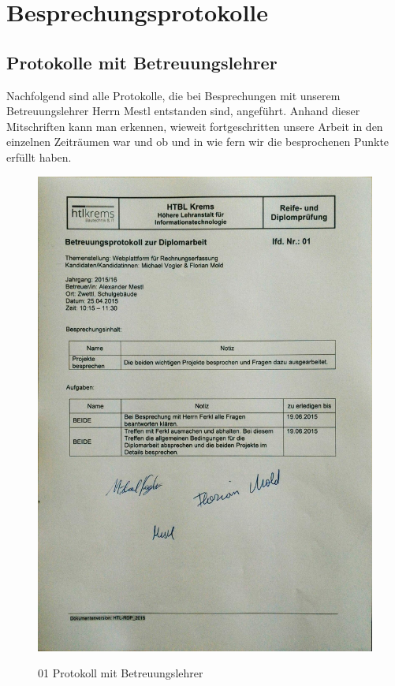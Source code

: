 \chapter{Besprechungsprotokolle}
\section{Protokolle mit Betreuungslehrer}
Nachfolgend sind alle Protokolle, die bei Besprechungen mit unserem Betreuungslehrer Herrn Mestl entstanden sind, angeführt. Anhand dieser Mitschriften kann man erkennen, wieweit fortgeschritten unsere Arbeit in den einzelnen Zeiträumen war und ob und in wie fern wir die besprochenen Punkte erfüllt haben.
\begin{figure}[!h]
    \centering
    \includegraphics[width=13cm]{figures/Mestl_01.jpg}
    \label{fig:01_Protokoll_Betreuungslehrer}
    \caption{01 Protokoll mit Betreuungslehrer}
\end{figure}
